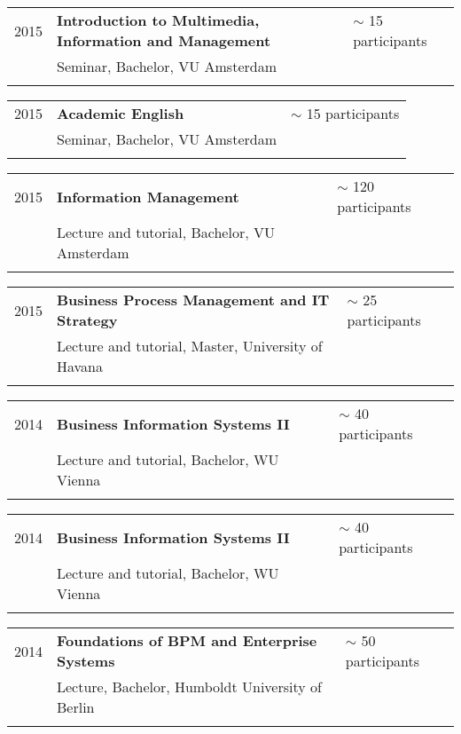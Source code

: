 \begin{tabular}{P{3cm}P{8cm}P{3cm}}		
2015		& \textbf{Introduction to Multimedia, Information and Management} & 	$\sim$ 15 participants \\
				& Seminar, Bachelor, VU Amsterdam \\
				\\
\end{tabular}
\begin{tabular}{P{3cm}P{8cm}P{3cm}}		
2015		& \textbf{Academic English}					 	& $\sim$ 15 participants \\
				& Seminar, Bachelor, VU Amsterdam	\\ 	
				\\		
\end{tabular}
\begin{tabular}{P{3cm}P{8cm}P{3cm}}				
2015		& \textbf{Information Management}				& 	$\sim$ 120 participants \\
				& Lecture and tutorial, Bachelor, VU Amsterdam \\
\\				
\end{tabular}
\begin{tabular}{P{3cm}P{8cm}P{3cm}}		
2015		& \textbf{Business Process Management and IT Strategy}	 &  $\sim$ 25 participants \\
				& Lecture and tutorial, Master, University of Havana \\
			\\
\end{tabular}
\begin{tabular}{P{3cm}P{8cm}P{3cm}}		
2014	 	& \textbf{Business Information Systems II}			& $\sim$ 40 participants \\
				& Lecture and tutorial, Bachelor, WU Vienna \\				
				\\
\end{tabular}
\begin{tabular}{P{3cm}P{8cm}P{3cm}}		
2014		& \textbf{Business Information Systems II}				& $\sim$ 40 participants \\
				& Lecture and tutorial, Bachelor, WU Vienna \\
				\\
\end{tabular}
\begin{tabular}{P{3cm}P{8cm}P{3cm}}		
2014		& \textbf{Foundations of BPM and Enterprise Systems}		&  $\sim$ 50 participants \\
				& Lecture, Bachelor, Humboldt University of Berlin \\
\\
\end{tabular}
